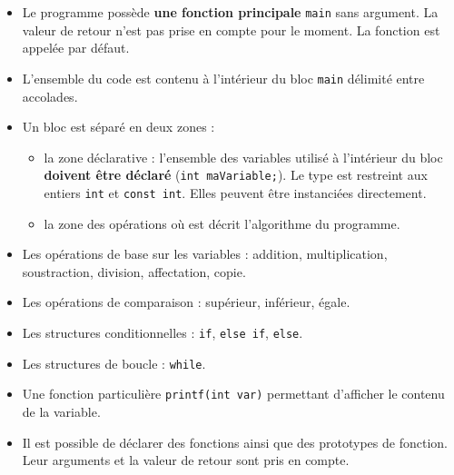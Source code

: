 \begin{itemize}

    \item Le programme possède \textbf{une fonction principale} \texttt{main} sans argument. La valeur de retour n'est pas prise en compte pour le moment. La fonction est appelée par défaut.
    
    \item L'ensemble du code est contenu à l'intérieur du bloc \texttt{main} délimité entre accolades.
    
    \item Un bloc est séparé en deux zones : 
    
    \begin{itemize}
    
        \item la zone déclarative : l'ensemble des variables utilisé à l'intérieur du bloc \textbf{doivent être déclaré} (\texttt{int maVariable;}). Le type est restreint aux entiers \texttt{int} et \texttt{const int}. Elles peuvent être instanciées directement. 
        
        \item la zone des opérations où est décrit l'algorithme du programme. 
        
    \end{itemize}
    
    \item Les opérations de base sur les variables : addition, multiplication, soustraction, division, affectation, copie.
    
    \item Les opérations de comparaison : supérieur, inférieur, égale.
    
    \item Les structures conditionnelles : \texttt{if}, \texttt{else if}, \texttt{else}.
    
    \item Les structures de boucle : \texttt{while}.
    
    \item Une fonction particulière \texttt{printf(int var)} permettant d'afficher le contenu de la variable.
    
    \item Il est possible de déclarer des fonctions ainsi que des prototypes de fonction. Leur arguments et la valeur de retour sont pris en compte.
    
\end{itemize}


